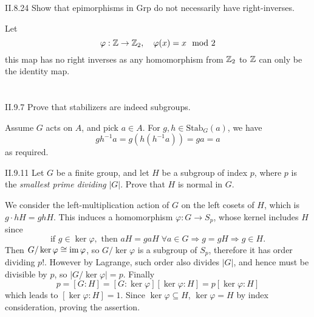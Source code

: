\begin{problem}{II.8.24}
Show that epimorphisms in \textsf{Grp} do not necessarily have right-inverses.
\end{problem}
\begin{pf}
Let 
\[
\varphi : \mathbb{Z} \to \mathbb{Z}_2, \quad \varphi(x) = x\mod 2
\]
this map has no right inverses as any homomorphism from $\mathbb{Z}_2$ to $\mathbb{Z}$ can only be the identity map.
\end{pf}

\section{}

\begin{problem}{II.9.7}
Prove that stabilizers are indeed subgroups.
\end{problem}
\begin{pf}
Assume $G$ acts on $A$, and pick $a \in A$. For $g,h \in \text{Stab}_G(a)$, we have
\[
gh^{-1}a = g(h(h^{-1}a)) = ga = a
\]
as required.
\end{pf}

\begin{problem}{II.9.11}
Let $G$ be a finite group, and let $H$ be a subgroup of index $p$, where $p$ is the \emph{smallest prime dividing} $|G|$. Prove that $H$ is normal in $G$.
\end{problem}
\begin{pf}
We consider the left-multiplication action of $G$ on the left cosets of $H$, which is $g \cdot hH = ghH$. This induces a homomorphism $\varphi : G \to S_p$, whose kernel includes $H$ since
\[
\text{if } g \in \ker \varphi, \text{ then } aH = gaH \; \forall a \in G \Rightarrow g = gH \Rightarrow g \in H.
\]
Then $G/\ker \varphi \cong \operatorname{im} \varphi$, so $G/\ker \varphi$ is a subgroup of $S_p$, therefore it has order dividing $p!$. However by Lagrange, such order also divides $|G|$, and hence must be divisible by $p$, so $|G/\ker \varphi| = p$. Finally
\[
p = [G : H] = [G : \ker \varphi][\ker \varphi : H] = p[\ker \varphi : H]
\]
which leads to $[\ker \varphi : H] = 1$. Since $\ker \varphi \subseteq H$, $\ker \varphi = H$ by index consideration, proving the assertion. 
\end{pf}

